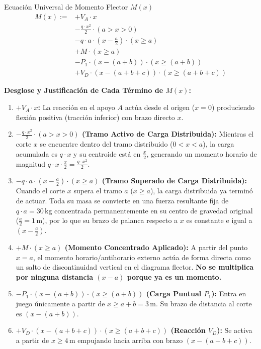 \documentclass[10pt,a4paper]{article}
\begin{document}
\begin{mathcadbox}{Ecuación Universal de Momento Flector $M(x)$}
\begin{align*}
    M(x) := &+ V_A \cdot x \\
            &- \frac{q \cdot x^2}{2} \cdot (a > x > 0) \\
            &- q \cdot a \cdot \left(x - \frac{a}{2}\right) \cdot (x \ge a) \\
            &+ M \cdot (x \ge a) \\
            &- P_1 \cdot (x - (a + b)) \cdot (x \ge (a + b)) \\
            &+ V_D \cdot (x - (a + b + c)) \cdot (x \ge (a + b + c))
\end{align*}
\end{mathcadbox}

\noindent \textbf{Desglose y Justificación de Cada Término de $M(x)$:}
\begin{enumerate}[leftmargin=*,itemsep=2pt]
    \item \textbf{$+ V_A \cdot x$:} La reacción en el apoyo $A$ actúa desde el origen ($x=0$) produciendo flexión positiva (tracción inferior) con brazo directo $x$.
    \item \textbf{$- \frac{q \cdot x^2}{2} \cdot (a > x > 0)$ (Tramo Activo de Carga Distribuida):} Mientras el corte $x$ se encuentre dentro del tramo distribuido ($0 < x < a$), la carga acumulada es $q \cdot x$ y su centroide está en $\frac{x}{2}$, generando un momento horario de magnitud $q \cdot x \cdot \frac{x}{2} = \frac{q \cdot x^2}{2}$.
    \item \textbf{$- q \cdot a \cdot \left(x - \frac{a}{2}\right) \cdot (x \ge a)$ (Tramo Superado de Carga Distribuida):} Cuando el corte $x$ supera el tramo $a$ ($x \ge a$), la carga distribuida ya terminó de actuar. Toda su masa se convierte en una fuerza resultante fija de $q \cdot a = 30\,\text{kg}$ concentrada permanentemente en su centro de gravedad original ($\frac{a}{2} = 1\,\text{m}$), por lo que su brazo de palanca respecto a $x$ es constante e igual a $\left(x - \frac{a}{2}\right)$.
    \item \textbf{$+ M \cdot (x \ge a)$ (Momento Concentrado Aplicado):} A partir del punto $x = a$, el momento horario/antihorario externo actúa de forma directa como un salto de discontinuidad vertical en el diagrama flector. \textbf{No se multiplica por ninguna distancia $(x - a)$ porque ya es un momento.}
    \item \textbf{$- P_1 \cdot (x - (a + b)) \cdot (x \ge (a + b))$ (Carga Puntual $P_1$):} Entra en juego únicamente a partir de $x \ge a + b = 3\,\text{m}$. Su brazo de distancia al corte es $(x - (a+b))$.
    \item \textbf{$+ V_D \cdot (x - (a + b + c)) \cdot (x \ge (a + b + c))$ (Reacción $V_D$):} Se activa a partir de $x \ge 4\,\text{m}$ empujando hacia arriba con brazo $(x - (a+b+c))$.
\end{enumerate}
\end{document}

